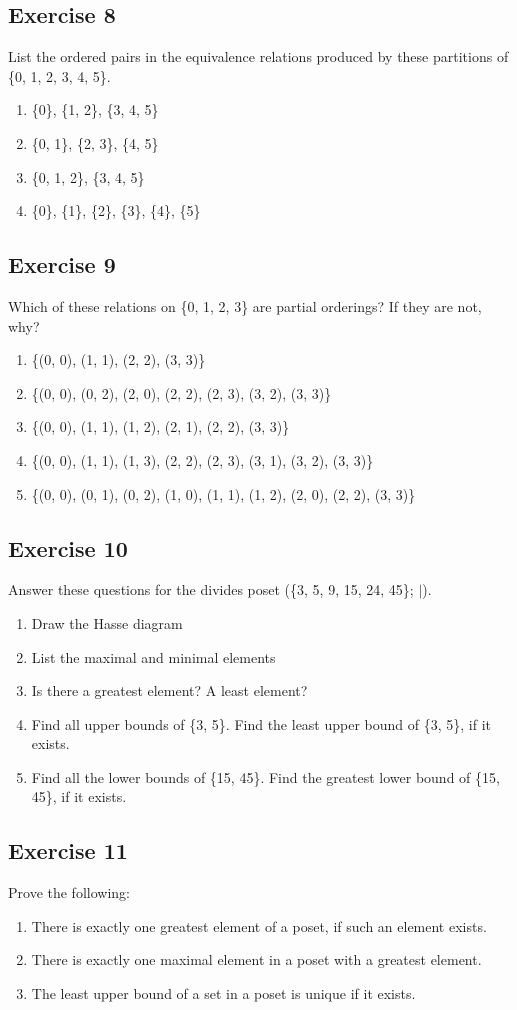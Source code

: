 \documentclass{article}
\newcommand\ssc[2][\DefaultOpt]{%
  \def\DefaultOpt{#2}%
  \subsection[#1]{#2}%
}
\newcommand{\balist}{\begin{enumerate}[label=\alph*.]}
\newcommand{\elist}{\end{enumerate}}
\newcommand{\bk}[1]{\{#1\}}
\begin{document}
\ssc{Exercise 8}{
List the ordered pairs in the equivalence relations produced by these partitions of \bk{0, 1, 2, 3, 4, 5}.

\balist
\item \bk{0}, \bk{1, 2}, \bk{3, 4, 5}
\item \bk{0, 1}, \bk{2, 3}, \bk{4, 5}
\item \bk{0, 1, 2}, \bk{3, 4, 5}
\item \bk{0}, \bk{1}, \bk{2}, \bk{3}, \bk{4}, \bk{5}
\elist
}

\ssc{Exercise 9}{

Which of these relations on \bk{0, 1, 2, 3} are partial orderings? If they are not, why?

\balist 
\item \bk{(0, 0), (1, 1), (2, 2), (3, 3)}
\item \bk{(0, 0), (0, 2), (2, 0), (2, 2), (2, 3), (3, 2), (3, 3)}
\item \bk{(0, 0), (1, 1), (1, 2), (2, 1), (2, 2), (3, 3)}
\item \bk{(0, 0), (1, 1), (1, 3), (2, 2), (2, 3), (3, 1), (3, 2), (3, 3)}
\item \bk{(0, 0), (0, 1), (0, 2), (1, 0), (1, 1), (1, 2), (2, 0), (2, 2), (3, 3)}
\elist 
}

\ssc{Exercise 10}{

Answer these questions for the divides poset (\bk{3, 5, 9, 15, 24, 45}; $\mid$).
\balist
\item Draw the Hasse diagram
\item List the maximal and minimal elements
\item Is there a greatest element? A least element?
\item Find all upper bounds of \bk{3, 5}. Find the least upper bound of \bk{3, 5}, if it exists.
\item Find all the lower bounds of \bk{15, 45}. Find the greatest lower bound of \bk{15, 45}, if it exists.
\elist

}

\ssc{Exercise 11}{

Prove the following:

\balist
\item There is exactly one greatest element of a poset, if such an element exists.
\item There is exactly one maximal element in a poset with a greatest element.
\item The least upper bound of a set in a poset is unique if it exists.
\elist

}
\end{document}
